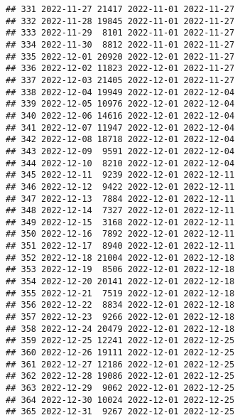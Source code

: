 \documentclass[
]{article}
\begin{document}
\begin{verbatim}
## 331 2022-11-27 21417 2022-11-01 2022-11-27
## 332 2022-11-28 19845 2022-11-01 2022-11-27
## 333 2022-11-29  8101 2022-11-01 2022-11-27
## 334 2022-11-30  8812 2022-11-01 2022-11-27
## 335 2022-12-01 20920 2022-12-01 2022-11-27
## 336 2022-12-02 11823 2022-12-01 2022-11-27
## 337 2022-12-03 21405 2022-12-01 2022-11-27
## 338 2022-12-04 19949 2022-12-01 2022-12-04
## 339 2022-12-05 10976 2022-12-01 2022-12-04
## 340 2022-12-06 14616 2022-12-01 2022-12-04
## 341 2022-12-07 11947 2022-12-01 2022-12-04
## 342 2022-12-08 18718 2022-12-01 2022-12-04
## 343 2022-12-09  9591 2022-12-01 2022-12-04
## 344 2022-12-10  8210 2022-12-01 2022-12-04
## 345 2022-12-11  9239 2022-12-01 2022-12-11
## 346 2022-12-12  9422 2022-12-01 2022-12-11
## 347 2022-12-13  7884 2022-12-01 2022-12-11
## 348 2022-12-14  7327 2022-12-01 2022-12-11
## 349 2022-12-15  3168 2022-12-01 2022-12-11
## 350 2022-12-16  7892 2022-12-01 2022-12-11
## 351 2022-12-17  8940 2022-12-01 2022-12-11
## 352 2022-12-18 21004 2022-12-01 2022-12-18
## 353 2022-12-19  8506 2022-12-01 2022-12-18
## 354 2022-12-20 20141 2022-12-01 2022-12-18
## 355 2022-12-21  7519 2022-12-01 2022-12-18
## 356 2022-12-22  8834 2022-12-01 2022-12-18
## 357 2022-12-23  9266 2022-12-01 2022-12-18
## 358 2022-12-24 20479 2022-12-01 2022-12-18
## 359 2022-12-25 12241 2022-12-01 2022-12-25
## 360 2022-12-26 19111 2022-12-01 2022-12-25
## 361 2022-12-27 12186 2022-12-01 2022-12-25
## 362 2022-12-28 19086 2022-12-01 2022-12-25
## 363 2022-12-29  9062 2022-12-01 2022-12-25
## 364 2022-12-30 10024 2022-12-01 2022-12-25
## 365 2022-12-31  9267 2022-12-01 2022-12-25
\end{verbatim}
\end{document}
